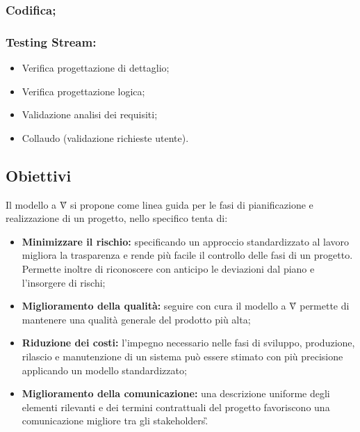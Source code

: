 \subsubsection*{Codifica;}

\subsubsection*{Testing Stream:}
\begin{itemize}
    \item Verifica progettazione di dettaglio;
    \item Verifica progettazione logica;
    \item Validazione analisi dei requisiti;
    \item Collaudo (validazione richieste utente).
\end{itemize}

\subsection{Obiettivi}
Il modello a V\G{} si propone come linea guida per le fasi di pianificazione e realizzazione di un progetto,
nello specifico tenta di:
\begin{itemize}
    \item \textbf{Minimizzare il rischio:} specificando un approccio standardizzato al lavoro migliora 
    la trasparenza e rende più facile il controllo delle fasi di un progetto. Permette inoltre di 
    riconoscere con anticipo le deviazioni dal piano e l'insorgere di rischi;
    \item \textbf{Miglioramento della qualità:} seguire con cura il modello a V\G{} permette di mantenere una
    qualità generale del prodotto più alta;
    \item \textbf{Riduzione dei costi:} l'impegno necessario nelle fasi di sviluppo, produzione, rilascio
    e manutenzione di un sistema può essere stimato con più precisione applicando un modello standardizzato;
    \item \textbf{Miglioramento della comunicazione:} una descrizione uniforme degli elementi rilevanti 
    e dei termini contrattuali del progetto favoriscono una comunicazione migliore tra gli stakeholders\G.
\end{itemize}

